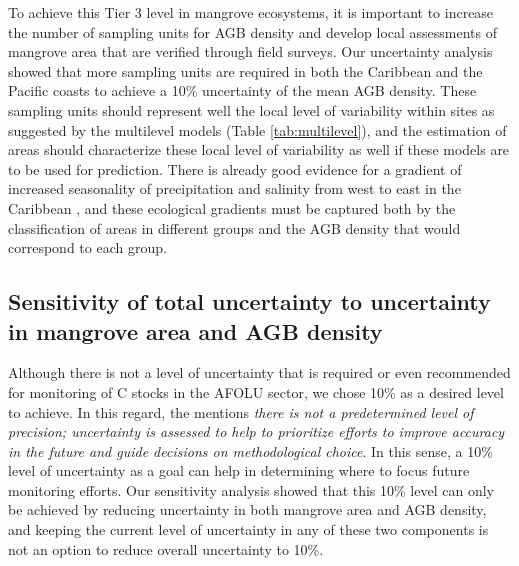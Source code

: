 \documentclass[review, authoryear]{elsarticle}   	%
\begin{document}


To achieve this Tier 3 level in mangrove ecosystems, it is important to increase the number of sampling units for AGB density and develop local assessments of mangrove area that are verified through field surveys. Our uncertainty analysis showed that more sampling units are required in both the Caribbean and the Pacific coasts to achieve a 10\% uncertainty of the mean AGB density. These sampling units should represent well the local level of variability within sites as suggested by the multilevel models (Table \ref{tab:multilevel}), and the estimation of areas should characterize these local level of variability as well if these models are to be used for prediction. There is already good evidence for a gradient of increased seasonality of precipitation and salinity from west to east in the Caribbean \citep{Polania2015}, and these ecological gradients must be captured both by the classification of areas in different groups and the AGB density that would correspond to each group. 

\subsection{Sensitivity of total uncertainty to uncertainty in mangrove area and AGB density}
Although there is not a level of uncertainty that is required or even recommended for monitoring of C stocks in the AFOLU sector, we chose 10\% as a desired level to achieve. In this regard, the \citet{IPCC2003} mentions \emph{there is not a predetermined level of precision; uncertainty is assessed to help to prioritize efforts to improve accuracy in the future and guide decisions on methodological choice}. In this sense, a 10\% level of uncertainty as a goal can help in determining where to focus future monitoring efforts. Our sensitivity analysis showed that this 10\% level can only be achieved by reducing uncertainty in both mangrove area and AGB density, and keeping the current level of uncertainty in any of these two components is not an option to reduce overall uncertainty to 10\%. 
\end{document}
